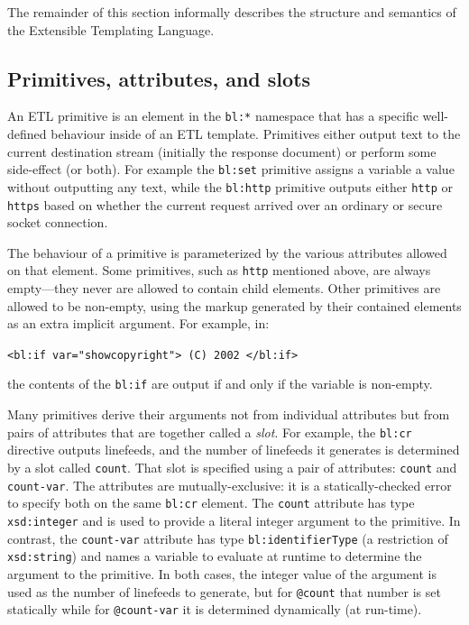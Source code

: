 \documentclass{www2003-submission}
\newcommand{\smtexttt}[1]{{\small\texttt{#1}}}
\newcommand{\ns}[1]{{\small\texttt{#1:*}}}
\begin{document}
The remainder of this section informally describes the structure and
semantics of the Extensible Templating Language.


\subsection{Primitives, attributes, and slots}
\label{ssec-primitives}

An ETL primitive is an element in the \ns{bl} namespace that has a
specific well-defined behaviour inside of an ETL template.  Primitives
either output text to the current destination stream (initially the
response document) or perform some side-effect (or both).  For example
the \smtexttt{bl:set} primitive assigns a variable a value without
outputting any text, while the
\smtexttt{bl:http} primitive outputs either \smtexttt{http} or
\smtexttt{https} based on whether the current request arrived over an
ordinary or secure socket connection.

The behaviour of a primitive is parameterized by the various
attributes allowed on that element.  Some primitives, such as
\smtexttt{http} mentioned above, are always empty---they never are
allowed to contain child elements. 
Other primitives are allowed to be non-empty, using the markup generated
by their contained elements as an extra implicit argument.  For example,
in:

\smtexttt{<bl:if var="showcopyright"> (C) 2002 </bl:if>}

\noindent the contents of the \smtexttt{bl:if} are output if and
only if the variable is non-empty.

Many primitives derive their arguments not from individual attributes
but from pairs of attributes that are together called a \emph{slot}.  For
example, the \smtexttt{bl:cr} directive outputs linefeeds, and the
number of linefeeds it generates is determined by a slot called
\smtexttt{count}.  That slot is specified using a pair of attributes:
\smtexttt{count} and \smtexttt{count-var}.  The attributes are
mutually-exclusive: it is a statically-checked error to specify both on
the same \smtexttt{bl:cr} element.  The \smtexttt{count} attribute has
type \smtexttt{xsd:integer} and is used to provide a literal integer
argument to the primitive.  In contrast, the \smtexttt{count-var}
attribute has type \smtexttt{bl:identifierType} (a restriction of
\smtexttt{xsd:string}) and names a variable to evaluate at runtime to
determine the argument to the primitive.  In both cases, the integer
value of the argument is used as the number of linefeeds to generate,
but for \smtexttt{@count} that number is set statically while for
\smtexttt{@count-var} it is determined dynamically (at run-time).
\end{document}
